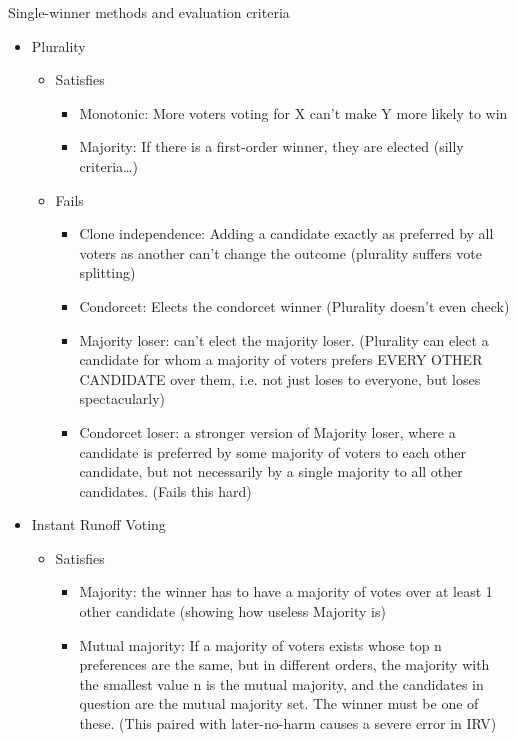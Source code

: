 Single-winner methods and evaluation criteria
\begin{itemize}
    \item Plurality
    \begin{itemize}
        \item Satisfies
        \begin{itemize}
            \item Monotonic:  More voters voting for X can't make Y more likely to win

            \item Majority:  If there is a first-order winner, they are elected (silly criteria…)
        \end{itemize}
        \item Fails
        \begin{itemize}
            \item Clone independence:  Adding a candidate exactly as preferred by all voters as another can't change the outcome (plurality suffers vote splitting)
            \item Condorcet:  Elects the condorcet winner (Plurality doesn't even check)
            \item Majority loser:  can't elect the majority loser.  (Plurality can elect a candidate for whom a majority of voters prefers EVERY OTHER CANDIDATE over them, i.e. not just loses to everyone, but loses spectacularly)
            \item Condorcet loser:  a stronger version of Majority loser, where a candidate is preferred by some majority of voters to each other candidate, but not necessarily by a single majority to all other candidates.  (Fails this hard)
        \end{itemize}
    \end{itemize}
    \item Instant Runoff Voting
    \begin{itemize}
        \item Satisfies
        \begin{itemize}
            \item Majority:  the winner has to have a majority of votes over at least 1 other candidate (showing how useless Majority is)
            \item Mutual majority:  If a majority of voters exists whose top n preferences are the same, but in different orders, the majority with the smallest value n is the mutual majority, and the candidates in question are the mutual majority set.  The winner must be one of these.  (This paired with later-no-harm causes a severe error in IRV)

\end{itemize}
\end{itemize}
\end{itemize}
